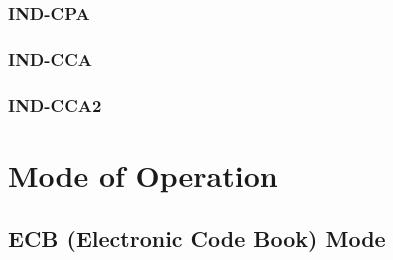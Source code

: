 \documentclass[12pt,openany]{book}
\theoremstyle{definition}
\begin{document}
	\subsection{IND-CPA}
	\subsection{IND-CCA}
	\subsection{IND-CCA2}
	
	\newpage
	\chapter{Mode of Operation}
	
	\section{ECB (Electronic Code Book) Mode}
\end{document}

